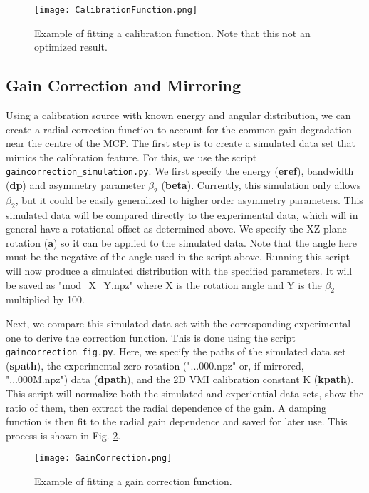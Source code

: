 \documentclass[12pt]{article}
\begin{document}
\begin{figure}
\centering
\texttt{[image: CalibrationFunction.png]}
\caption{
Example of fitting a calibration function. Note that this not an optimized result.
}\label{fig:CalibrationFunction}
\end{figure}

\subsection{Gain Correction and Mirroring}

Using a calibration source with known energy and angular distribution, we can create a radial correction function to account for the common gain degradation near the centre of the MCP.
The first step is to create a simulated data set that mimics the calibration feature.
For this, we use the script \texttt{gaincorrection\_simulation.py}.
We first specify the energy (\textbf{eref}), bandwidth (\textbf{dp}) and asymmetry parameter $\beta_2$ (\textbf{beta}).
Currently, this simulation only allows $\beta_2$, but it could be easily generalized to higher order asymmetry parameters.
This simulated data will be compared directly to the experimental data, which will in general have a rotational offset as determined above.
We specify the XZ-plane rotation (\textbf{a}) so it can be applied to the simulated data. 
Note that the angle here must be the negative of the angle used in the script above.
Running this script will now produce a simulated distribution with the specified parameters.
It will be saved as "mod\_X\_Y.npz" where X is the rotation angle and Y is the $\beta_2$ multiplied by 100.

Next, we compare this simulated data set with the corresponding experimental one to derive the correction function.
This is done using the script \texttt{gaincorrection\_fig.py}.
Here, we specify the paths of the simulated data set (\textbf{spath}), the experimental zero-rotation ("...000.npz" or, if mirrored, "...000M.npz") data (\textbf{dpath}), and the 2D VMI calibration constant K (\textbf{kpath}).
This script will normalize both the simulated and experiential data sets, show the ratio of them, then extract the radial dependence of the gain.
A damping function is then fit to the radial gain dependence and saved for later use.
This process is shown in Fig. \ref{fig:GainCorrection}.

\begin{figure}
\centering
\texttt{[image: GainCorrection.png]}
\caption{
Example of fitting a gain correction function.
}\label{fig:GainCorrection}
\end{figure}
\end{document}
